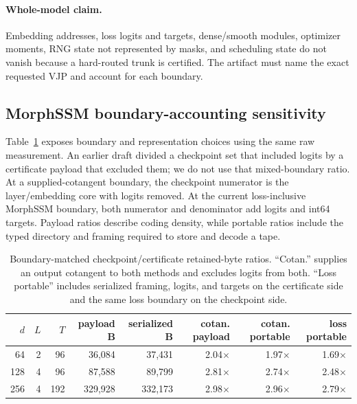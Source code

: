 \paragraph{Whole-model claim.}
Embedding addresses, loss logits and targets, dense/smooth modules, optimizer
moments, RNG state not represented by masks, and scheduling state do not vanish
because a hard-routed trunk is certified.  The artifact must name the exact
requested VJP and account for each boundary.

\subsection{MorphSSM boundary-accounting sensitivity}
\label{supp:accounting}

Table~\ref{tab:accounting-sensitivity} exposes boundary and representation
choices using the same raw measurement.  An earlier draft divided a checkpoint
set that included logits by a certificate payload that excluded them; we do not
use that mixed-boundary ratio.  At a supplied-cotangent boundary, the checkpoint
numerator is the layer/embedding core with logits removed.  At the current
loss-inclusive MorphSSM boundary, both numerator and denominator add logits and
int64 targets.  Payload ratios describe coding density, while portable ratios
include the typed directory and framing required to store and decode a tape.

\begin{table}[ht]
\centering
\caption{Boundary-matched checkpoint/certificate retained-byte ratios.
``Cotan.'' supplies an output cotangent to both methods and excludes logits
from both.  ``Loss portable'' includes serialized framing, logits, and targets
on the certificate side and the same loss boundary on the checkpoint side.}
\label{tab:accounting-sensitivity}
\small
\begin{tabular}{rrrrrrrr}
\toprule
$d$ & $L$ & $T$ & payload B & serialized B & cotan. payload & cotan. portable & loss portable \\
\midrule
64  & 2 & 96  & 36,084  & 37,431  & 2.04$\times$ & 1.97$\times$ & 1.69$\times$ \\
128 & 4 & 96  & 87,588  & 89,799  & 2.81$\times$ & 2.74$\times$ & 2.48$\times$ \\
256 & 4 & 192 & 329,928 & 332,173 & 2.98$\times$ & 2.96$\times$ & 2.79$\times$ \\
\bottomrule
\end{tabular}
\end{table}

